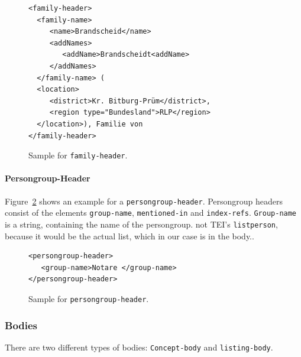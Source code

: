 \begin{figure}[H]
\centering
\begin{verbatim}
<family-header>
  <family-name>
     <name>Brandscheid</name>
     <addNames>
        <addName>Brandscheidt<addName>       
     </addNames>
  </family-name> (
  <location>
     <district>Kr. Bitburg-Prüm</district>, 
     <region type="Bundesland">RLP</region>
  </location>), Familie von 
</family-header>
\end{verbatim}
\label{fig:family-header-xml}
\caption{Sample for \texttt{family-header}.}
\end{figure}

\paragraph{Persongroup-Header}
Figure~\ref{fig:persongroup-header-xml} shows an example for a \texttt{persongroup-header}. Persongroup headers consist of the elements \texttt{group-name}, \texttt{mentioned-in} and \texttt{index-refs}. \texttt{Group-name} is a string, containing the name of the persongroup.
not TEI's \texttt{listperson}, because it would be the actual list, which in our case is in the body..

\begin{figure}[H]
\centering
\begin{verbatim}
<persongroup-header>
   <group-name>Notare </group-name>
</persongroup-header>
\end{verbatim}
\label{fig:persongroup-header-xml}
\caption{Sample for \texttt{persongroup-header}.}
\end{figure}

\subsubsection{Bodies}
There are two different types of bodies: \texttt{Concept-body} and \texttt{listing-body}.

